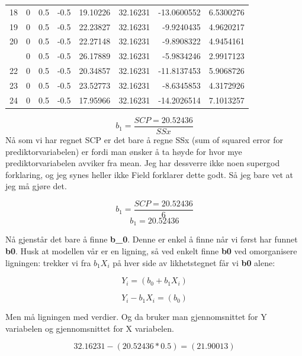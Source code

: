 \documentclass[
]{book}
\begin{document}
\begin{table}
\begin{tabular}[t]{rrrrrrrr}
18 & 0 & 0.5 & -0.5 & 19.10226 & 32.16231 & -13.0600552 & 6.5300276\\
19 & 0 & 0.5 & -0.5 & 22.23827 & 32.16231 & -9.9240435 & 4.9620217\\
20 & 0 & 0.5 & -0.5 & 22.27148 & 32.16231 & -9.8908322 & 4.9454161\\
\addlinespace
21 & 0 & 0.5 & -0.5 & 26.17889 & 32.16231 & -5.9834246 & 2.9917123\\
22 & 0 & 0.5 & -0.5 & 20.34857 & 32.16231 & -11.8137453 & 5.9068726\\
23 & 0 & 0.5 & -0.5 & 23.52773 & 32.16231 & -8.6345853 & 4.3172926\\
24 & 0 & 0.5 & -0.5 & 17.95966 & 32.16231 & -14.2026514 & 7.1013257\\
\bottomrule
\end{tabular}
\end{table}

\[ b_1 = \frac{SCP = 20.52436}{SSx} \]
Nå som vi har regnet SCP er det bare å regne SSx (sum of squared error for prediktorvariabelen) er fordi man ønsker å ta høyde for hvor mye prediktorvariabelen avviker fra mean. Jeg har dessverre ikke noen supergod forklaring, og jeg synes heller ikke Field forklarer dette godt. Så jeg bare vet at jeg må gjøre det.

\[ b_1 = \frac{SCP = 20.52436}{6} \]
\[ b_1 = 20.52436 \]

Nå gjenstår det bare å finne \textbf{b\_0}. Denne er enkel å finne når vi først har funnet \textbf{b0}. Husk at modellen vår er en ligning, så ved enkelt finne \textbf{b0} ved omorganisere ligningen: trekker vi fra \(b_1X_i\) på hver side av likhetstegnet får vi \textbf{b0} alene:

\[
Y_i = (b_0 + b_1X_i)
\]

\[
Y_i - b_1X_i = (b_0)
\]

Men må ligningen med verdier. Og da bruker man gjennomsnittet for Y variabelen og gjennomsnittet for X variabelen.

\[
32.16231     - (20.52436*0.5) = (21.90013)
\]

  
\end{document}
